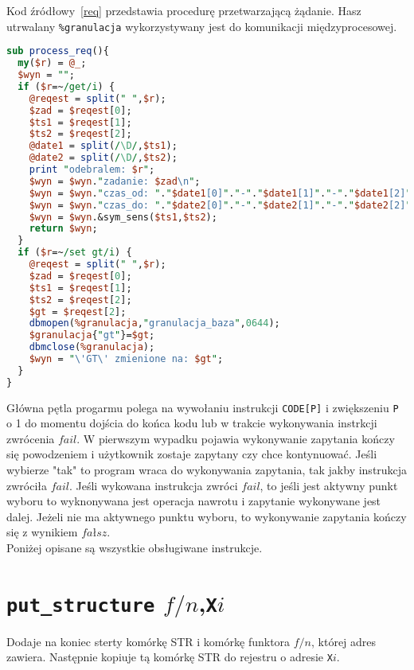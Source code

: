 {\color{dgray}
Kod źródłowy~\ref{req} przedstawia procedurę przetwarzającą żądanie. Hasz utrwalany \verb|%granulacja| wykorzystywany jest do komunikacji międzyprocesowej.
}

\begin{small}
\begin{lstlisting}[language=perl, frame=lines, caption=Przetwarzanie żądania - procedura \texttt{process\_req()}\label{req}., firstnumber=86]
sub process_req(){	
  my($r) = @_;
  $wyn = "";
  if ($r=~/get/i) {
	@reqest = split(" ",$r);
	$zad = $reqest[0];
	$ts1 = $reqest[1];
	$ts2 = $reqest[2];
	@date1 = split(/\D/,$ts1);
	@date2 = split(/\D/,$ts2);
	print "odebralem: $r"; 
	$wyn = $wyn."zadanie: $zad\n";
	$wyn = $wyn."czas_od: "."$date1[0]"."-"."$date1[1]"."-"."$date1[2]"."_"."$date1[3]".":"."$date1[4]".":"."$date1[5]"."\n";
	$wyn = $wyn."czas_do: "."$date2[0]"."-"."$date2[1]"."-"."$date2[2]"."_"."$date2[3]".":"."$date2[4]".":"."$date2[5]"."\n";		
	$wyn = $wyn.&sym_sens($ts1,$ts2);
	return $wyn;
  }
  if ($r=~/set gt/i) {
	@reqest = split(" ",$r);
	$zad = $reqest[0];
	$ts1 = $reqest[1];
	$ts2 = $reqest[2];
	$gt = $reqest[2];
	dbmopen(%granulacja,"granulacja_baza",0644);
	$granulacja{"gt"}=$gt;
	dbmclose(%granulacja);
	$wyn = "\'GT\' zmienione na: $gt";
  }		
}	
\end{lstlisting} 
\end{small}


Główna pętla progarmu polega na wywołaniu instrukcji \texttt{CODE[P]} i zwiększeniu \texttt{P} o 1 do momentu dojścia do końca kodu lub w trakcie wykonywania instrkcji zwrócenia $fail$. W pierwszym wypadku pojawia wykonywanie zapytania kończy się powodzeniem i użytkownik zostaje zapytany czy chce kontynuować. Jeśli wybierze "tak" to program wraca do wykonywania zapytania, tak jakby instrukcja zwróciła $fail$. Jeśli wykowana instrukcja zwróci $fail$, to jeśli jest aktywny punkt wyboru to wyknonywana jest operacja nawrotu i zapytanie wykonywane jest dalej. Jeżeli nie ma aktywnego punktu wyboru, to wykonywanie zapytania kończy się z wynikiem $fałsz$.\\
Poniżej opisane są wszystkie obsługiwane instrukcje.

\section{\texttt{put\_structure} $f/n$,\texttt{X}$i$}

Dodaje na koniec sterty komórkę STR i komórkę funktora $f/n$, której adres zawiera. Następnie kopiuje tą komórkę STR do rejestru o adresie \texttt{X}$i$.

